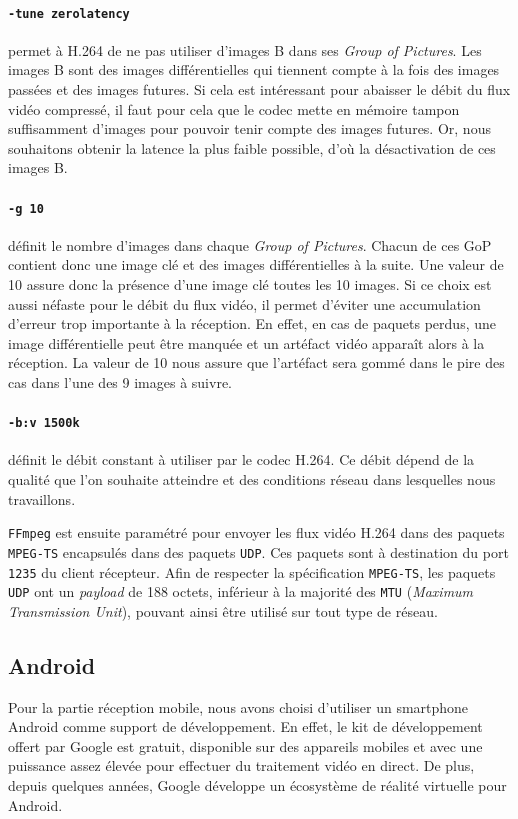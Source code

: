\documentclass[11pt,a4paper]{article}
\begin{document}
\paragraph{\texttt{-tune zerolatency}} permet à H.264 de ne pas utiliser d'images B dans ses \textit{Group of Pictures}.
Les images B sont des images différentielles qui tiennent compte à la fois des images passées et des images futures.
Si cela est intéressant pour abaisser le débit du flux vidéo compressé, il faut pour cela que le codec mette en mémoire tampon suffisamment d'images pour pouvoir tenir compte des images futures.
Or, nous souhaitons obtenir la latence la plus faible possible, d'où la désactivation de ces images B.

\paragraph{\texttt{-g 10}} définit le nombre d'images dans chaque \textit{Group of Pictures}.
Chacun de ces GoP contient donc une image clé et des images différentielles à la suite.
Une valeur de 10 assure donc la présence d'une image clé toutes les 10 images.
Si ce choix est aussi néfaste pour le débit du flux vidéo, il permet d'éviter une accumulation d'erreur trop importante à la réception.
En effet, en cas de paquets perdus, une image différentielle peut être manquée et un artéfact vidéo apparaît alors à la réception.
La valeur de 10 nous assure que l'artéfact sera gommé dans le pire des cas dans l'une des 9 images à suivre.

\paragraph{\texttt{-b:v 1500k}} définit le débit constant à utiliser par le codec H.264.
Ce débit dépend de la qualité que l'on souhaite atteindre et des conditions réseau dans lesquelles nous travaillons.

\bigbreak
\texttt{FFmpeg} est ensuite paramétré pour envoyer les flux vidéo H.264 dans des paquets \texttt{MPEG-TS} encapsulés dans des paquets \texttt{UDP}.
Ces paquets sont à destination du port \texttt{1235} du client récepteur.
Afin de respecter la spécification \texttt{MPEG-TS}, les paquets \texttt{UDP} ont un \textit{payload} de 188 octets, inférieur à la majorité des \texttt{MTU} (\textit{Maximum Transmission Unit}), pouvant ainsi être utilisé sur tout type de réseau.

\subsection{Android}
Pour la partie réception mobile, nous avons choisi d'utiliser un smartphone Android comme support de développement.
En effet, le kit de développement offert par Google est gratuit, disponible sur des appareils mobiles et avec une puissance assez élevée pour effectuer du traitement vidéo en direct.
De plus, depuis quelques années, Google développe un écosystème de réalité virtuelle pour Android.
\end{document}
